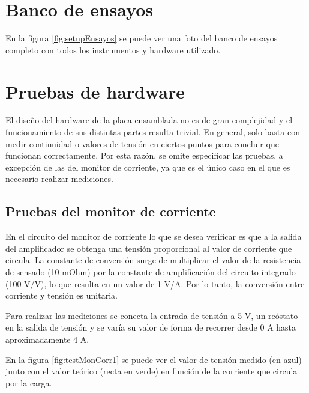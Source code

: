 \section{Banco de ensayos}

En la figura \ref{fig:setupEnsayos} se puede ver una foto del banco de ensayos completo con todos los instrumentos y hardware utilizado.


\section{Pruebas de hardware}
\label{sec:pruebasHW}

El diseño del hardware de la placa ensamblada no es de gran complejidad y el funcionamiento de sus distintas partes resulta trivial. En general, solo basta con medir continuidad o valores de tensión en ciertos puntos para concluir que funcionan correctamente. Por esta razón, se omite especificar las pruebas, a excepción de las del monitor de corriente, ya que es el único caso en el que es necesario realizar mediciones.

\subsection{Pruebas del monitor de corriente}

En el circuito del monitor de corriente lo que se desea verificar es que a la salida del amplificador se obtenga una tensión proporcional al valor de corriente que circula. La constante de conversión surge de multiplicar el valor de la resistencia de sensado (10 mOhm) por la constante de amplificación del circuito integrado (100 V/V), lo que resulta en un valor de 1 V/A. Por lo tanto, la conversión entre corriente y tensión es unitaria.

Para realizar las mediciones se conecta la entrada de tensión a 5 V, un reóstato en la salida de tensión y se varía su valor de forma de recorrer desde 0 A hasta aproximadamente 4 A.

En la figura \ref{fig:testMonCorr1} se puede ver el valor de tensión medido (en azul) junto con el valor teórico (recta en verde) en función de la corriente que circula por la carga. 


